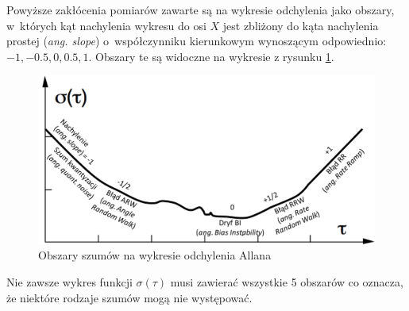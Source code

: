 Powyższe zakłócenia pomiarów zawarte są na wykresie odchylenia jako obszary, w~których kąt nachylenia wykresu do osi $X$ jest zbliżony do kąta nachylenia prostej (\emph{ang. slope}) o~współczynniku kierunkowym wynoszącym odpowiednio: $-1, -0.5, 0, 0.5 , 1$. Obszary te są widoczne na wykresie z rysunku \ref{fig:appx:allan:slopes}.

\begin{savenotes}
	\begin{figure}[h]
		\centering
		\includegraphics[width=\linewidth]{images/slopes.png}
		\caption[Obszary szumów na wykresie odchylenia Allana]{Obszary szumów na wykresie odchylenia Allana \cite{s120202219}}
		\label{fig:appx:allan:slopes}
	\end{figure}
\end{savenotes}
				
Nie zawsze wykres funkcji $\sigma(\tau)$ musi zawierać wszystkie 5 obszarów co oznacza, że niektóre rodzaje szumów mogą nie występować.
